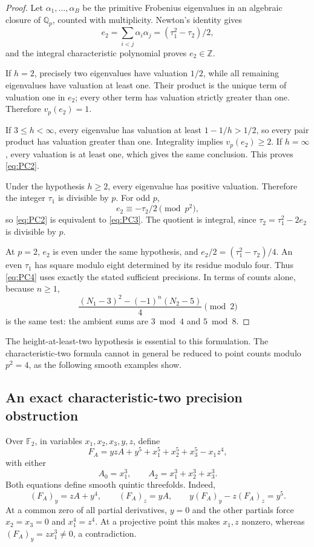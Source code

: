 \begin{proof}
Let $\alpha_1,\ldots,\alpha_B$ be the primitive Frobenius eigenvalues
in an algebraic closure of $\mathbb Q_p$, counted with multiplicity.
Newton's identity gives
\[
 e_2=\sum_{i<j}\alpha_i\alpha_j
     =(\tau_1^2-\tau_2)/2,
\]
and the integral characteristic polynomial proves $e_2\in\mathbb Z$.

If $h=2$, precisely two eigenvalues have valuation $1/2$, while all
remaining eigenvalues have valuation at least one. Their product is
the unique term of valuation one in $e_2$; every other term has
valuation strictly greater than one. Therefore $v_p(e_2)=1$.

If $3\le h<\infty$, every eigenvalue has valuation at least
$1-1/h>1/2$, so every pair product has valuation greater than one.
Integrality implies $v_p(e_2)\ge2$. If $h=\infty$, every valuation is
at least one, which gives the same conclusion.
This proves \eqref{eq:PC2}.

Under the hypothesis $h\ge2$, every eigenvalue has positive valuation.
Therefore the integer $\tau_1$ is divisible by $p$.
For odd $p$,
\[
 e_2\equiv-\tau_2/2\pmod{p^2},
\]
so \eqref{eq:PC2} is equivalent to \eqref{eq:PC3}. The quotient is integral, since
$\tau_2=\tau_1^2-2e_2$ is divisible by $p$.

At $p=2$, $e_2$ is even under the same hypothesis, and
$e_2/2=(\tau_1^2-\tau_2)/4$.
An even $\tau_1$ has square modulo eight determined by its residue
modulo four. Thus \eqref{eq:PC4} uses exactly the stated sufficient precisions.
In terms of counts alone, because $n\ge1$,
\begin{equation}
 \frac{(N_1-3)^2-(-1)^n(N_2-5)}4\pmod2             \label{eq:PC5}
\end{equation}
is the same test: the ambient sums are $3\bmod4$ and $5\bmod8$.
\end{proof}

The height-at-least-two hypothesis is essential to this formulation.
The characteristic-two formula cannot in general be reduced to
point counts modulo $p^2=4$, as the following smooth examples show.

\subsection{An exact characteristic-two precision obstruction}
Over $\mathbb F_2$, in variables $x_1,x_2,x_3,y,z$, define
\[
 F_A=yzA+y^5+x_1^5+x_2^5+x_3^5-x_1z^4,
\]
with either
\[
 A_0=x_1^3,\qquad A_2=x_1^3+x_2^3+x_3^3.
\]
Both equations define smooth quintic threefolds.
Indeed,
\[
 (F_A)_y=zA+y^4,\qquad (F_A)_z=yA,\qquad
 y(F_A)_y-z(F_A)_z=y^5.
\]
At a common zero of all partial derivatives, $y=0$ and the other
partials force $x_2=x_3=0$ and $x_1^4=z^4$.
At a projective point this makes $x_1,z$ nonzero, whereas
$(F_A)_y=z x_1^3\ne0$, a contradiction.

